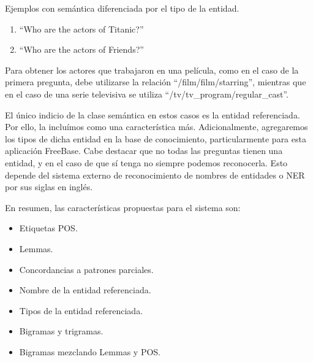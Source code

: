 \begin{example} Ejemplos con semántica diferenciada por el tipo de la entidad.
    \begin{enumerate}
        \item ``Who are the actors of Titanic?''
        \item ``Who are the actors of Friends?''
    \end{enumerate}
    Para obtener los actores que trabajaron en una película, como en el caso de la primera pregunta, debe utilizarse la relación ``/film/film/starring'', mientras que en el caso de una serie televisiva se utiliza ``/tv/tv\_program/regular\_cast''.
\end{example}

El único indicio de la clase semántica en estos casos es la entidad referenciada. Por ello, la incluímos como una característica más. Adicionalmente, agregaremos los tipos de dicha entidad en la base de conocimiento, particularmente para esta aplicación FreeBase. Cabe destacar que no todas las preguntas tienen una entidad, y en el caso de que sí tenga no siempre podemos reconocerla. Esto depende del sistema externo de reconocimiento de nombres de entidades o NER por sus siglas en inglés.

En resumen, las características propuestas para el sistema son:
\begin{itemize}
    \item Etiquetas POS.
    \item Lemmas.
    \item Concordancias a patrones parciales.
    \item Nombre de la entidad referenciada.
    \item Tipos de la entidad referenciada.
    \item Bigramas y trigramas.
    \item Bigramas mezclando Lemmas y POS.
\end{itemize}

